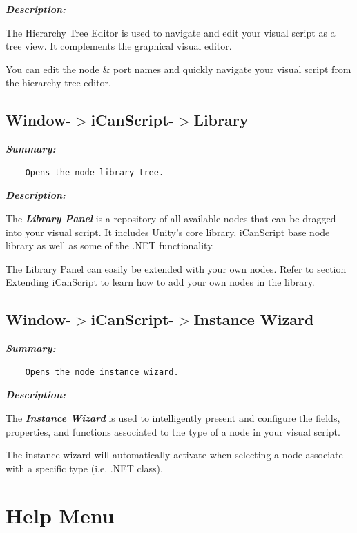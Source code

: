 \emph{\textbf{Description:}}

The Hierarchy Tree Editor is used to navigate and edit your visual script as a tree view. It complements the graphical visual editor.

You can edit the node \& port names and quickly navigate your visual script from the hierarchy tree editor.

\subsection{Window-$>$iCanScript-$>$Library}
\label{window-icanscript-library}

\emph{\textbf{Summary:}}

\begin{verbatim}
    Opens the node library tree.
\end{verbatim}

\emph{\textbf{Description:}}

The \emph{\textbf{Library Panel}} is a repository of all available nodes that can be dragged into your visual script. It includes Unity's core library, iCanScript base node library as well as some of the .NET functionality.

The Library Panel can easily be extended with your own nodes. Refer to section Extending iCanScript to learn how to add your own nodes in the library.

\subsection{Window-$>$iCanScript-$>$Instance Wizard}
\label{window-icanscript-instancewizard}

\emph{\textbf{Summary:}}

\begin{verbatim}
    Opens the node instance wizard.
\end{verbatim}

\emph{\textbf{Description:}}

The \emph{\textbf{Instance Wizard}} is used to intelligently present and configure the fields, properties, and functions associated to the type of a node in your visual script.

The instance wizard will automatically activate when selecting a node associate with a specific type (i.e. .NET class).

\section{Help Menu}
\label{helpmenu}

